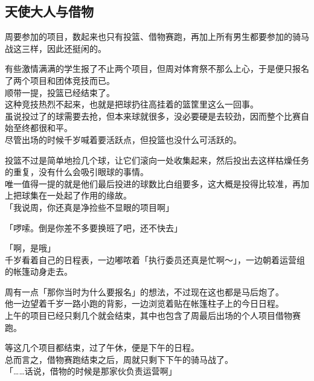 \subsection{天使大人与借物}

周要参加的项目，数起来也只有投篮、借物赛跑，再加上所有男生都要参加的骑马战这三样，因此还挺闲的。

有些激情满满的学生报了不止两个项目，但周对体育祭不那么上心，于是便只报名了两个项目和团体竞技而已。\\

顺带一提，投篮已经结束了。\\

这种竞技热烈不起来，也就是把球扔往高挂着的篮筐里这么一回事。\\

虽说投过了的球需要去抢，但本来球就很多，没必要硬是去较劲，因而整个比赛自始至终都很和平。\\

尽管出场的时候千岁喊着要活跃点，但投篮也没什么可活跃的。

投篮不过是简单地捡几个球，让它们滚向一处收集起来，然后投出去这样枯燥任务的重复，没有什么会吸引眼球的事情。\\

唯一值得一提的就是他们最后投进的球数比白组要多，这大概是投得比较准，再加上把球集在一处起了作用的缘故。\\

「我说周，你还真是净捡些不显眼的项目啊」

「啰嗦。倒是你差不多要换班了吧，还不快去」

「啊，是哦」\\

千岁看着自己的日程表，一边嘟哝着「执行委员还真是忙啊～」，一边朝着运营组的帐篷动身走去。

周有一点「那你当时为什么要报名」的想法，不过现在这也都是马后炮了。\\

他一边望着千岁一路小跑的背影，一边浏览着贴在帐篷柱子上的今日日程。\\

上午的项目已经只剩几个就会结束，其中也包含了周最后出场的个人项目借物赛跑。

等这几个项目都结束，过了午休，便是下午的日程。\\

总而言之，借物赛跑结束之后，周就只剩下下午的骑马战了。\\

「……话说，借物的时候是那家伙负责运营啊」\\

